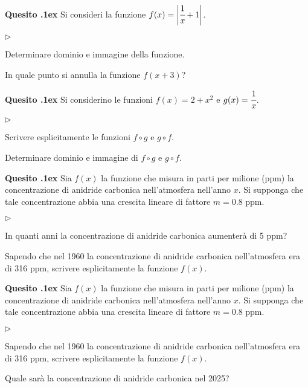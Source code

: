 \documentclass[11pt,twoside,a4paper]{article}
\newcommand{\mylabel}[1]{#1\hfill}
\renewenvironment{itemize}
  {\begin{list}{$\triangleright$}{%
   \setlength{\parskip}{0mm}
   \setlength{\topsep}{.4\baselineskip}
   \setlength{\rightmargin}{0mm}
   \setlength{\listparindent}{0mm}
   \setlength{\itemindent}{0mm}
   \setlength{\labelwidth}{2ex}
   \setlength{\itemsep}{.4\baselineskip}
   \setlength{\parsep}{0mm}
   \setlength{\partopsep}{0mm}
   \setlength{\labelsep}{1ex}
   \setlength{\leftmargin}{\labelwidth+\labelsep}
   \let\makelabel\mylabel}}{%
   \end{list}\vspace*{-1.3mm}}
\newcounter{quesito}
\newenvironment{question}{\bigskip\addtocounter{quesito}{1}\bigskip\bigskip\par\textbf{Quesito \thequesito.\kern1ex}}{\vspace{\parskip}}
\begin{document}
\begin{question}
Si consideri la funzione $f(x) = \bigg| \cfrac{1}{x} + 1 \bigg|$.
\begin{itemize}
\item[1.] Determinare dominio e immagine della funzione.
\item[2.] In quale punto si annulla la funzione $f(x+3)$?
\end{itemize}
\end{question}

\begin{question}
Si considerino le funzioni $f(x) = 2 + x^2$ e $g(x) = \cfrac{1}{x}$.
\begin{itemize}
\item[1.] Scrivere esplicitamente le funzioni $f \circ g$ e $g \circ f$.
\item[2.] Determinare dominio e immagine di $f \circ g$ e $g \circ f$.
\end{itemize}
\end{question}

\begin{question}
Sia $f(x)$ la funzione che misura in parti per milione (ppm) la concentrazione di anidride carbonica nell'atmosfera nell'anno $x$. Si supponga che tale concentrazione abbia una crescita lineare di fattore $m = 0.8$ ppm.
\begin{itemize}
\item[1.] In quanti anni la concentrazione di anidride carbonica aumenter\`a di 5 ppm?
\item[2.] Sapendo che nel 1960 la concentrazione di anidride carbonica nell'atmosfera era di 316 ppm, scrivere esplicitamente la funzione $f(x)$.
\end{itemize}
\end{question}

\begin{question}
Sia $f(x)$ la funzione che misura in parti per milione (ppm) la concentrazione di anidride carbonica nell'atmosfera nell'anno $x$. Si supponga che tale concentrazione abbia una crescita lineare di fattore $m = 0.8$ ppm.
\begin{itemize}
\item[1.] Sapendo che nel 1960 la concentrazione di anidride carbonica nell'atmosfera era di 316 ppm, scrivere esplicitamente la funzione $f(x)$.
\item[2.] Quale sar\`a la concentrazione di anidride carbonica nel 2025?
\end{itemize}
\end{question}
\end{document}
